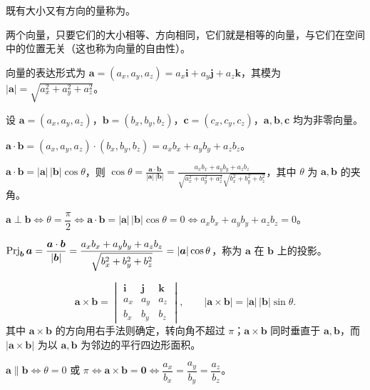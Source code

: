 


既有大小又有方向的量称为。

\begin{notebox}
两个向量，只要它们的大小相等、方向相同，它们就是相等的向量，与它们在空间中的位置无关（这也称为向量的自由性）。
\end{notebox}

向量的表达形式为 $\bm a=(a_x,a_y,a_z)=a_x\bm i+a_y\bm j+a_z\bm k$，其模为 $|\bm a|=\sqrt{a_x^2+a_y^2+a_z^2}$。


设 $\bm a=(a_x,a_y,a_z)$，$\bm b=(b_x,b_y,b_z)$，$\bm c=(c_x,c_y,c_z)$，$\bm a,\bm b,\bm c$ 均为非零向量。


 $\bm a\cdot\bm b=(a_x,a_y,a_z)\cdot(b_x,b_y,b_z)=a_xb_x+a_yb_y+a_zb_z$。

 $\bm a\cdot\bm b=|\bm a|\,|\bm b|\cos\theta$，则
$\displaystyle \cos\theta=\frac{\bm a\cdot\bm b}{|\bm a|\,|\bm b|}
=\frac{a_xb_x+a_yb_y+a_zb_z}
{\sqrt{a_x^2+a_y^2+a_z^2}\sqrt{b_x^2+b_y^2+b_z^2}}$，其中 $\theta$ 为 $\bm a,\bm b$ 的夹角。

 $\bm a\perp\bm b\Longleftrightarrow\theta=\dfrac{\pi}{2}
\Longleftrightarrow\bm a\cdot\bm b=|\bm a|\,|\bm b|\cos\theta=0
\Longleftrightarrow a_xb_x+a_yb_y+a_zb_z=0$。

 $\displaystyle \operatorname{Prj}_{\bm b}\bm a
=\frac{\bm a\cdot\bm b}{|\bm b|}
=\frac{a_xb_x+a_yb_y+a_zb_z}{\sqrt{b_x^2+b_y^2+b_z^2}}
=|\bm a|\cos\theta$，称为 $\bm a$ 在 $\bm b$ 上的投影。


\[
\bm a\times\bm b=
\begin{vmatrix}
\bm i&\bm j&\bm k\\
a_x&a_y&a_z\\
b_x&b_y&b_z
\end{vmatrix},
\qquad |\bm a\times\bm b|=|\bm a|\,|\bm b|\sin\theta .
\]
其中 $\bm a\times\bm b$ 的方向用右手法则确定，转向角不超过 $\pi$；$\bm a\times\bm b$ 同时垂直于 $\bm a,\bm b$，而 $|\bm a\times\bm b|$ 为以 $\bm a,\bm b$ 为邻边的平行四边形面积。

 $\bm a\parallel\bm b\Longleftrightarrow\theta=0$ 或 $\pi
\Longleftrightarrow\bm a\times\bm b=\bm0
\Longleftrightarrow\dfrac{a_x}{b_x}=\dfrac{a_y}{b_y}=\dfrac{a_z}{b_z}$。

